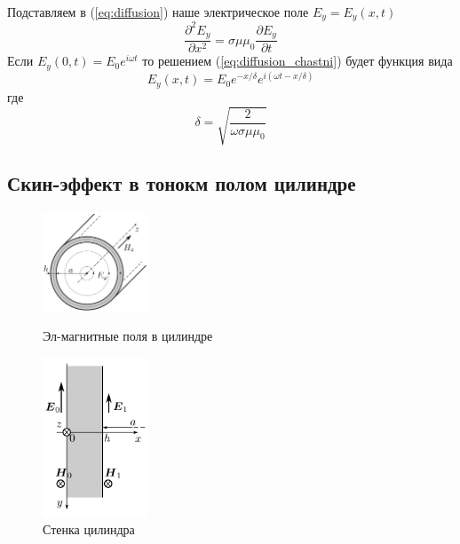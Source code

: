 \documentclass[a4paper, 12pt]{article}
\begin{document}
	Подставляем в (\ref{eq:diffusion}) наше электрическое поле $E_y=E_y(x,t)$
	\begin{equation}
		\frac{\partial^2 E_y}{\partial x^2} = \sigma\mu\mu_0\frac{\partial E_y}{\partial t}
		\label{eq:diffusion_chastni}
	\end{equation}
	Если $E_y(0,t)=E_0 e^{i\omega t}$ то решением (\ref{eq:diffusion_chastni}) будет функция вида
	\begin{equation}
		E_y(x,t)=E_0 e^{-x/\delta} e^{i(\omega t - x/\delta)}
		\label{eq:skin_effect_poluprostranstvo}
	\end{equation}
	где
	\begin{equation}
		\delta = \sqrt{\frac{2}{\omega\sigma\mu\mu_0}}
		\label{eq:delta}
	\end{equation}
	
	\newpage
	\subsection*{Скин-эффект в тонокм полом цилиндре}
	\vspace{1cm}
	\begin{figure}
		\begin{center}
			\includegraphics[width=0.28\textwidth]{cilindr}
		\end{center}
		\caption{Эл-магнитные поля в цилиндре}\label{fig:cilindr}
		
		\begin{center}
			\includegraphics[width=0.28\textwidth]{stenka}
		\end{center}
		\caption{Стенка цилиндра}\label{fig:stenka}
	\end{figure}
	
\end{document}
